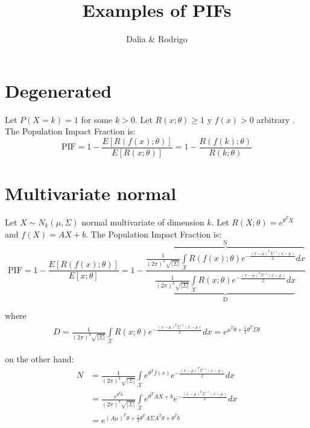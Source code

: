 \documentclass{article}
\title{Examples of PIFs}
\author{Dalia \& Rodrigo}
\date{}
\begin{document}
\maketitle

\section{Degenerated}
Let $P(X = k) = 1$ for some $k > 0$. Let $R(x;\theta) \geq 1$ y $f(x) > 0$ arbitrary . The Population Impact Fraction is:
\begin{equation}
    \textrm{PIF} = 1 - \frac{E\left[ R\left( f(x); \theta \right) \right]}{E\left[ R(x; \theta ) \right]} = 1 -\frac{ R\left( f(k); \theta \right)}{R\left( k; \theta \right)} 
\end{equation}

\section{Multivariate normal}
Let $X \sim N_{k}(\mu, \Sigma)$ normal multivariate of dimension $k$. Let $R(X;\theta) = e^{\theta^T X}$ and $f(X) = A X + b$. The Population Impact Fraction is: 
\begin{equation}
    \textrm{PIF} = 1 - \frac{E\left[ R\left( f(x); \theta \right) \right]}{E\left[ x; \theta \right]} = 1 - \frac{\overbrace{\frac{1}{{(2 \pi)}^{k} \sqrt{| \Sigma |}} \int\limits_{\mathcal{X}} R\left( f(x); \theta \right) e^{-\frac{(x - \mu)^T \Sigma^{-1} (x - \mu)}{2}}dx}^{\textrm{N}}} {\underbrace{\frac{1}{{(2 \pi)}^{k} \sqrt{| \Sigma |}} \int\limits_{\mathcal{X}} R\left( x; \theta \right) e^{-\frac{(x - \mu)^T\Sigma^{-1} (x - \mu)}{2}}dx}_{\textrm{D}}} \label{PIFNormal1}
\end{equation}

where 
\begin{equation}
    \begin{aligned}
    D = \frac{1}{{(2 \pi)}^{k} \sqrt{| \Sigma |}} \int\limits_{\mathcal{X}} R\left( x; \theta \right) e^{-\frac{(x - \mu)^T\Sigma^{-1} (x - \mu)}{2}}dx  = e^{\mu^{T} \theta + \frac{1}{2} \theta^T \Sigma \theta}
    \end{aligned}
\end{equation}

on the other hand:
\begin{equation}
    \begin{aligned}
    N & = \frac{1}{{(2 \pi)}^{k} \sqrt{| \Sigma |}} \int\limits_{\mathcal{X}} e^{\theta^T f(x)} e^{-\frac{(x - \mu)^T \Sigma^{-1} (x - \mu)}{2}}dx  \\
    & = \frac{ e^{\theta^T b}}{{(2 \pi)}^{k} \sqrt{| \Sigma |}} \int\limits_{\mathcal{X}} e^{\theta^T A X + b} e^{-\frac{(x - \mu)^T \Sigma^{-1} (x - \mu)}{2}}dx \\
    & = e^{ (A \mu)^T \theta  + \frac{1}{2} \theta^T A \Sigma A^T \theta   +  \theta^T b}
    \end{aligned}
\end{equation}
\end{document}
